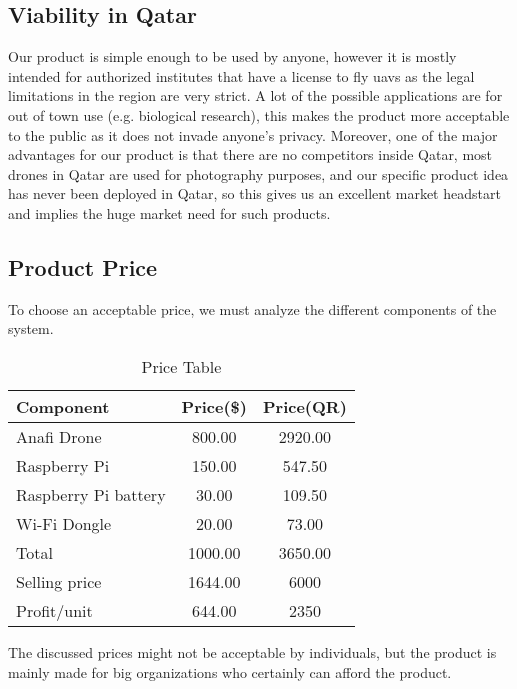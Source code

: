 \documentclass[../main.tex]{subfiles}
\begin{document}
\subsection{Viability in Qatar}
	Our product is simple enough to be used by anyone, however it is mostly intended for 
	authorized institutes that have a license to fly \glspl{uav} as the legal limitations 
	in the region are very strict. 
	A lot of the possible applications are for out of town use (e.g. biological research), 
	this makes the product more acceptable to the public as it does not invade anyone's privacy.
	Moreover, one of the major advantages for our product is that there are no competitors 
	inside Qatar, most drones in Qatar are used for photography purposes, and our
	specific product idea has never been deployed in Qatar, so this gives us an excellent 
	market headstart and implies the huge market need for such products.
\subsection{Product Price}
	To choose an acceptable price, we must analyze the different components of the system.
	\\
	\begin{table}[h!]
		\begin{center}
			\caption{Price Table}
			\label{tab: components prices}
			\begin{tabular}{p{3.5cm}|c|c} 
				\textbf{Component} & \textbf{Price(\$)} & \textbf{Price(QR)}\\
				\hline
				Anafi Drone & 800.00 & 2920.00 \\
				Raspberry Pi & 150.00 & 547.50 \\
				Raspberry Pi battery & 30.00 & 109.50\\
				Wi-Fi Dongle & 20.00 & 73.00\\
				\hline 
				Total & 1000.00 & 3650.00 \\
				Selling price & 1644.00 & 6000 \\ 
				Profit/unit & 644.00 & 2350 \\
				\hline
			\end{tabular}
		\end{center}
	\end{table}

	The discussed prices might not be acceptable by individuals, but the product is mainly made for big organizations who certainly can afford the product.
	
\end{document}
